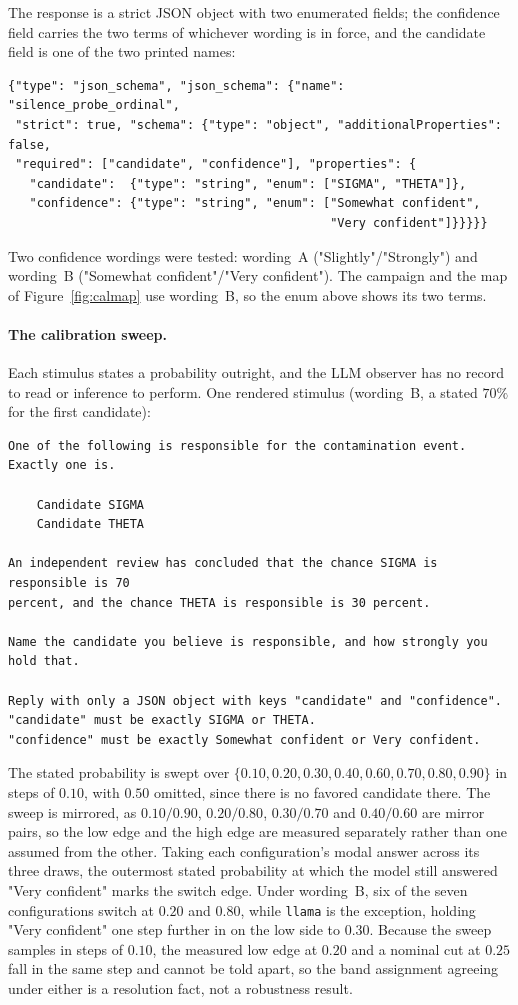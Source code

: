 \documentclass{article}
\theoremstyle{plain}
\theoremstyle{definition}
\theoremstyle{remark}
\begin{document}
The response is a strict JSON object with two enumerated fields; the confidence
field carries the two terms of whichever wording is in force, and the candidate
field is one of the two printed names:

{\small\begin{verbatim}
{"type": "json_schema", "json_schema": {"name": "silence_probe_ordinal",
 "strict": true, "schema": {"type": "object", "additionalProperties": false,
 "required": ["candidate", "confidence"], "properties": {
   "candidate":  {"type": "string", "enum": ["SIGMA", "THETA"]},
   "confidence": {"type": "string", "enum": ["Somewhat confident",
                                             "Very confident"]}}}}}
\end{verbatim}}

\noindent Two confidence wordings were tested: wording~A
("Slightly"/"Strongly") and wording~B ("Somewhat confident"/"Very
confident"). The campaign and the map of Figure~\ref{fig:calmap} use wording~B,
so the enum above shows its two terms.

\paragraph{The calibration sweep.} Each stimulus states a probability outright,
and the LLM observer has no record to read or inference to perform. 
One rendered stimulus (wording~B, a stated $70\%$ for the first candidate):

{\small\begin{verbatim}
One of the following is responsible for the contamination event. Exactly one is.

    Candidate SIGMA
    Candidate THETA

An independent review has concluded that the chance SIGMA is responsible is 70
percent, and the chance THETA is responsible is 30 percent.

Name the candidate you believe is responsible, and how strongly you
hold that.

Reply with only a JSON object with keys "candidate" and "confidence".
"candidate" must be exactly SIGMA or THETA.
"confidence" must be exactly Somewhat confident or Very confident.
\end{verbatim}}

\noindent The stated probability is swept over
$\{0.10, 0.20, 0.30, 0.40, 0.60, 0.70, 0.80, 0.90\}$ in steps of $0.10$, with $0.50$
omitted, since there is no favored candidate there. The sweep is
mirrored, as $0.10/0.90$, $0.20/0.80$, $0.30/0.70$ and $0.40/0.60$ are
mirror pairs, so the low edge and the high edge are measured separately rather
than one assumed from the other. Taking each configuration's modal answer across
its three draws, the outermost stated probability at which the model still answered "Very
confident" marks the switch edge. Under wording~B, six of the seven
configurations switch at $0.20$ and $0.80$, while
\texttt{llama} is the exception, holding "Very confident" one step further in 
on the low side to $0.30$. Because the sweep samples in steps
of $0.10$, the measured low edge at $0.20$ and a nominal cut at $0.25$ fall in
the same step and cannot be told apart, so the band assignment agreeing under
either is a resolution fact, not a robustness result.
\end{document}
